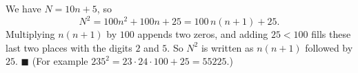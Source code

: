 We have $N=10n+5$, so
\[N^2=100n^2+100n+25=100\,n(n+1)+25.\]
Multiplying $n(n+1)$ by $100$ appends two zeros, and adding $25<100$ fills these last two places with the digits $2$ and $5$. So $N^2$ is written as $n(n+1)$ followed by $25$. $\blacksquare$ (For example $235^2=23\cdot24\cdot100+25=55225$.)
